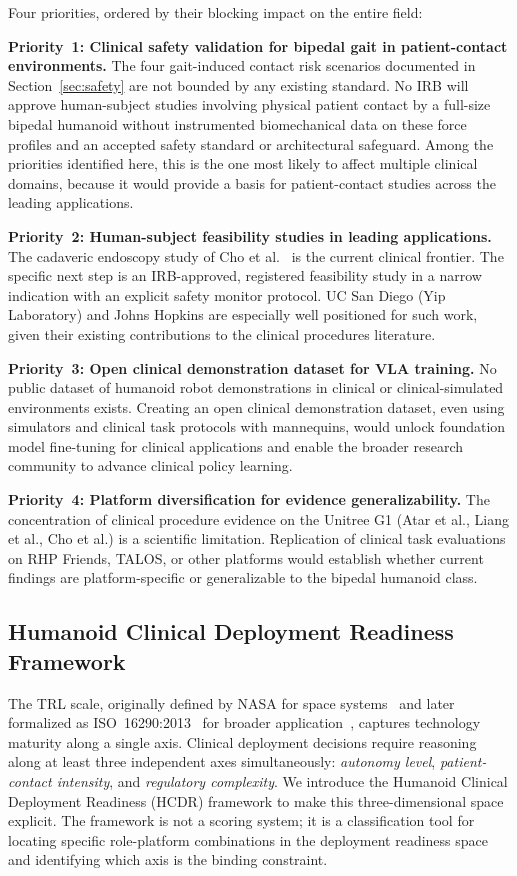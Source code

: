 Four priorities, ordered by their blocking impact on the entire field:

\textbf{Priority~1: Clinical safety validation for bipedal gait in patient-contact
environments.} The four gait-induced contact risk scenarios documented in
Section~\ref{sec:safety} are not bounded by any existing standard. No IRB will
approve human-subject studies involving physical patient contact by a full-size
bipedal humanoid without instrumented biomechanical data on these force profiles
and an accepted safety standard or architectural safeguard. Among the priorities
identified here, this is the one most likely to affect multiple clinical domains,
because it would provide a basis for patient-contact studies across the leading
applications.

\textbf{Priority~2: Human-subject feasibility studies in leading applications.}
The cadaveric endoscopy study of Cho et al.~\cite{cho2026humanoid} is the current
clinical frontier. The specific next step is an IRB-approved, registered
feasibility study in a narrow indication with an explicit safety monitor protocol.
UC San Diego (Yip Laboratory) and Johns Hopkins are especially well positioned
for such work, given their existing contributions to the clinical procedures
literature.

\textbf{Priority~3: Open clinical demonstration dataset for VLA training.} No
public dataset of humanoid robot demonstrations in clinical or
clinical-simulated environments exists. Creating an open clinical demonstration
dataset, even using simulators and clinical task protocols with mannequins, would
unlock foundation model fine-tuning for clinical applications and enable the
broader research community to advance clinical policy learning.

\textbf{Priority~4: Platform diversification for evidence generalizability.} The
concentration of clinical procedure evidence on the Unitree G1 (Atar et al., Liang et al., Cho et al.) is a
scientific limitation. Replication of clinical task evaluations on RHP Friends,
TALOS, or other platforms would establish whether current findings are
platform-specific or generalizable to the bipedal humanoid class.

\subsection{Humanoid Clinical Deployment Readiness Framework}
\label{sec:hcdr}

The TRL scale, originally defined by NASA for space systems~\cite{mankins1995trl}
and later formalized as ISO~16290:2013~\cite{iso16290} for broader
application~\cite{heder2017trl}, captures technology maturity along a single
axis. Clinical deployment decisions require reasoning along at least three
independent axes simultaneously: \emph{autonomy level}, \emph{patient-contact intensity}, and
\emph{regulatory complexity}. We introduce the Humanoid Clinical Deployment
Readiness (HCDR) framework to make this three-dimensional space explicit. The
framework is not a scoring system; it is a classification tool for locating
specific role-platform combinations in the deployment readiness space and
identifying which axis is the binding constraint.


